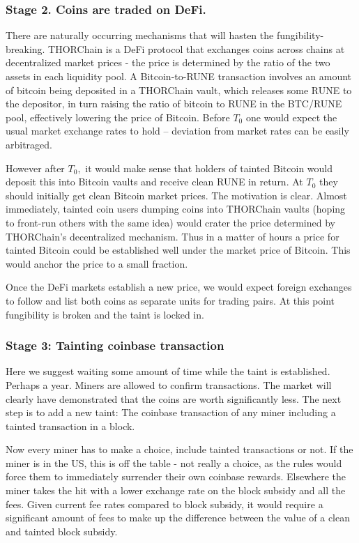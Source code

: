 \documentclass{article}%
\begin{document}
\subsubsection{Stage 2. Coins are traded on DeFi.}

There are naturally occurring mechanisms that will hasten the
fungibility-breaking.  THORChain is a DeFi protocol that exchanges coins
across chains at decentralized market prices - the price is determined by the ratio of the two assets in each liquidity pool.   A Bitcoin-to-RUNE
transaction involves an amount of bitcoin being deposited in a THORChain
vault, which releases some RUNE to the depositor, in turn raising the ratio of bitcoin to RUNE in the BTC/RUNE pool, effectively lowering the price of Bitcoin.  Before $T_{0}$
one would expect the usual market exchange rates to hold -- deviation from market rates can be easily arbitraged.  

However after $T_{0},$ it would make sense that holders of tainted Bitcoin would deposit this into Bitcoin vaults and receive clean RUNE in
return.  At $T_{0}$ they should initially get clean Bitcoin market prices.    The motivation is clear. Almost immediately, tainted coin
users dumping coins into THORChain vaults (hoping to front-run others with the
same idea) would crater the price determined by THORChain's decentralized mechanism. Thus in a matter of hours a price for
tainted Bitcoin could be established well under the market price of Bitcoin.
 This would anchor the price to a small fraction.

Once the DeFi markets establish a new price, we would expect foreign exchanges
to follow and list both coins as separate units for trading pairs.  At this
point fungibility is broken and the taint is locked in.

\subsubsection{Stage 3: Tainting coinbase transaction}

Here we suggest waiting some amount of time while the taint is established.
 Perhaps a year. Miners are allowed to confirm transactions.  The market
will clearly have demonstrated that the coins are worth significantly less.  The
next step is to add a new taint: The coinbase transaction of any miner
including a tainted transaction in a block.

Now every miner has to make a choice, include tainted transactions or not.
 If the miner is in the US, this is off the table - not really a
choice, as the rules would force them to immediately surrender their own coinbase rewards. Elsewhere the miner takes the hit with a lower exchange rate on the block subsidy and all the
fees.  Given current fee rates compared to block subsidy, it would require a
significant amount of fees to make up the difference between the value of a
clean and tainted block subsidy.
\end{document}
